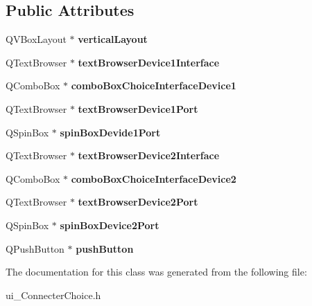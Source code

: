 \subsection*{Public Attributes}
\begin{DoxyCompactItemize}
\item 
\hypertarget{class_ui___connecter_choice_a9a6787467c328398e28fb1042ad5e90f}{Q\-V\-Box\-Layout $\ast$ {\bfseries vertical\-Layout}}\label{class_ui___connecter_choice_a9a6787467c328398e28fb1042ad5e90f}

\item 
\hypertarget{class_ui___connecter_choice_a6dd430ddebac7d030a36e98fe8d1d482}{Q\-Text\-Browser $\ast$ {\bfseries text\-Browser\-Device1\-Interface}}\label{class_ui___connecter_choice_a6dd430ddebac7d030a36e98fe8d1d482}

\item 
\hypertarget{class_ui___connecter_choice_ae4b4b110f9e3937edcb50d106299d924}{Q\-Combo\-Box $\ast$ {\bfseries combo\-Box\-Choice\-Interface\-Device1}}\label{class_ui___connecter_choice_ae4b4b110f9e3937edcb50d106299d924}

\item 
\hypertarget{class_ui___connecter_choice_a12ad4b1cb650833c96027a2a314051af}{Q\-Text\-Browser $\ast$ {\bfseries text\-Browser\-Device1\-Port}}\label{class_ui___connecter_choice_a12ad4b1cb650833c96027a2a314051af}

\item 
\hypertarget{class_ui___connecter_choice_a22ccf66793081bdc804c59eeea285d11}{Q\-Spin\-Box $\ast$ {\bfseries spin\-Box\-Devide1\-Port}}\label{class_ui___connecter_choice_a22ccf66793081bdc804c59eeea285d11}

\item 
\hypertarget{class_ui___connecter_choice_aeff2d39ba755343c208111b73afb45df}{Q\-Text\-Browser $\ast$ {\bfseries text\-Browser\-Device2\-Interface}}\label{class_ui___connecter_choice_aeff2d39ba755343c208111b73afb45df}

\item 
\hypertarget{class_ui___connecter_choice_a808805bd2b4318ef0d7df75a43221df6}{Q\-Combo\-Box $\ast$ {\bfseries combo\-Box\-Choice\-Interface\-Device2}}\label{class_ui___connecter_choice_a808805bd2b4318ef0d7df75a43221df6}

\item 
\hypertarget{class_ui___connecter_choice_afc3b697bbe739922270ec861e8d48b28}{Q\-Text\-Browser $\ast$ {\bfseries text\-Browser\-Device2\-Port}}\label{class_ui___connecter_choice_afc3b697bbe739922270ec861e8d48b28}

\item 
\hypertarget{class_ui___connecter_choice_ada2ae22ab8a88c9d00d8523409f310e4}{Q\-Spin\-Box $\ast$ {\bfseries spin\-Box\-Device2\-Port}}\label{class_ui___connecter_choice_ada2ae22ab8a88c9d00d8523409f310e4}

\item 
\hypertarget{class_ui___connecter_choice_a7128ba3b2b45fa6e0876893fa0a8c766}{Q\-Push\-Button $\ast$ {\bfseries push\-Button}}\label{class_ui___connecter_choice_a7128ba3b2b45fa6e0876893fa0a8c766}

\end{DoxyCompactItemize}


The documentation for this class was generated from the following file\-:\begin{DoxyCompactItemize}
\item 
ui\-\_\-\-Connecter\-Choice.\-h\end{DoxyCompactItemize}

